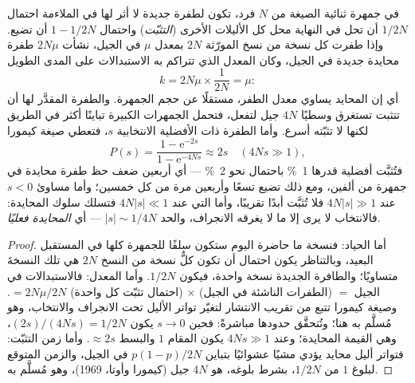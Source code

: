 \begin{theorem}\label{thm:b3:molecular-evolution:neutral}
في جمهرة ثنائية الصيغة من $N$ فرد، تكون لطفرة جديدة لا أثر
لها في الملاءمة احتمال $1/2N$ أن تحل في النهاية محل كل
الأليلات الأخرى (\emph{التثبّت}) واحتمال $1 - 1/2N$ أن تضيع.
وإذا طفرت كل نسخة من نسخ المورّثة $2N$ بمعدل $\mu$ في الجيل،
نشأت $2N\mu$ طفرة محايدة جديدة في الجيل، وكان المعدل الذي
تتراكم به الاستبدالات على المدى الطويل
\[
k = 2N\mu\times\frac{1}{2N} = \mu :
\]
أي إن \emph{} المحايد يساوي معدل الطفر، مستقلًا
عن حجم الجمهرة. والطفرة المقدَّر لها أن تتثبت تستغرق وسطيًا
$4N$ جيل لتفعل، فتحمل الجمهرات الكبيرة تباينًا أكثر في
الطريق لكنها لا تثبّته أسرع. وأما الطفرة ذات الأفضلية
الانتخابية $s$، فتعطي صيغة كيمورا 
\[
P(s) = \frac{1 - \mathrm{e}^{-2s}}{1 - \mathrm{e}^{-4Ns}} \approx 2s
\quad (4Ns \gg 1),
\]
فتُثبَّت أفضلية قدرها \qty{1}{\%} باحتمال نحو
\qty{2}{\%} --- أي أربعين ضعف حظ طفرة محايدة في
جمهرة من ألفين، ومع ذلك تضيع تسعًا وأربعين مرة من كل خمسين؛
وأما مساوئ $s < 0$ عند $4N|s| \gg 1$ فلا تُثبَّت أبدًا
تقريبًا، وأما التي عند $4N|s| \ll 1$ فتسلك سلوك المحايدة:
فالانتخاب لا يرى إلا ما لا يغرقه الانجراف، والحد $|s| \sim
1/4N$ --- أي \emph{المحايدة فعليًا}.
\end{theorem}
\begin{proof}
أما الحياد: فنسخة ما حاضرة اليوم ستكون سلفًا للجمهرة كلها في
المستقبل البعيد، وبالتناظر يكون احتمال أن تكون كلُّ نسخة من
النسخ $2N$ هي تلك النسخةَ متساويًا؛ والطافرة الجديدة نسخة
واحدة، فيكون $1/2N$. وأما المعدل: فالاستبدالات في الجيل $=$
(الطفرات الناشئة في الجيل) $\times$ (احتمال تثبّت كل واحدة)
$= 2N\mu/2N$. وصيغة كيمورا تتبع من تقريب الانتشار لتغيّر تواتر
الأليل تحت الانجراف والانتخاب، وهو مُسلَّم به هنا؛ وتُتحقَّق
حدودها مباشرةً: فحين $s \to 0$ يكون $(2s)/(4Ns) = 1/2N$، وهي
القيمة المحايدة؛ وعند $4Ns \gg 1$ يكون المقام $1$ والبسط
$\approx 2s$. وأما زمن التثبّت: فتواتر أليل محايد يؤدي مشيًا
عشوائيًا بتباين $p(1-p)/2N$ في الجيل، والزمن المتوقع لبلوغ
$1$ من $1/2N$، بشرط بلوغه، هو $4N$ جيل (كيمورا وأوتا، 1969)،
وهو مُسلَّم به.
\end{proof}

